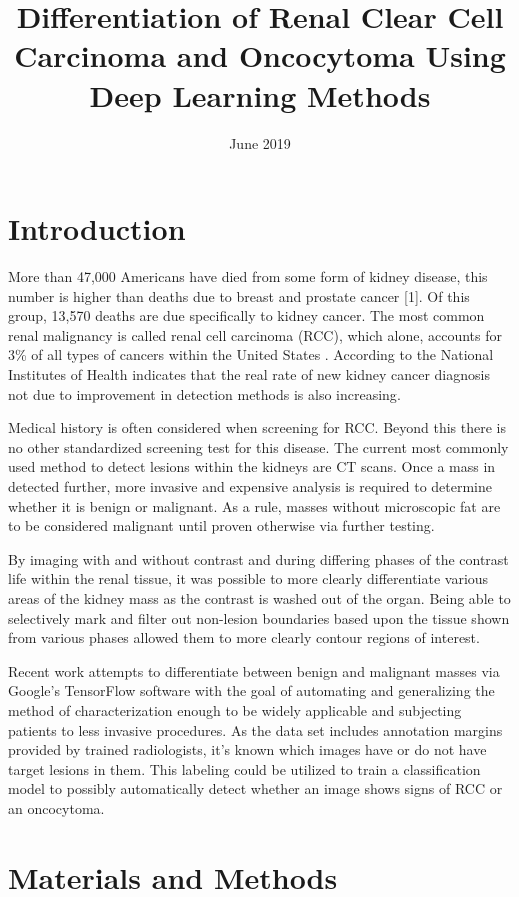 \documentclass[conference]{IEEEtran}
\title{Differentiation of Renal Clear Cell Carcinoma and Oncocytoma Using Deep Learning Methods}
\author{\IEEEauthorblockN{Erdi Kidane}
\IEEEauthorblockA{\textit{UCLA} \\
Los Angeles, USA \\
Erdi.Kidane@engineering.ucla.edu}
\and
\IEEEauthorblockN{Xuesen Cui}
\IEEEauthorblockA{\textit{UCLA} \\
Los Angeles, USA \\
cuixuesen@ucla.edu}
\and
\IEEEauthorblockN{Keane Gonzalez}
\IEEEauthorblockA{\textit{} 
Los Angeles, USA \\
kgonza@g.ucla.edu}
}
\date{June 2019}
\begin{document}
\maketitle

\section{Introduction}
More than 47,000 Americans have died from some form of kidney disease, this number is higher than deaths due to breast and prostate cancer [1]. Of this group, 13,570 deaths are due specifically to kidney cancer\cite{b2}.  The most common renal malignancy is called renal cell carcinoma (RCC), which alone, accounts for 3\% of all types of cancers within the United States\cite{b3} . According to the National Institutes of Health indicates that the real rate of new kidney cancer diagnosis not due to improvement in detection methods is also increasing\cite{b3}.  

Medical history is often considered when screening for RCC.  Beyond this there is no other standardized screening test for this disease\cite{b4}.  The current most commonly used method to detect lesions within the kidneys are CT scans.  Once a mass in detected further, more invasive and expensive analysis is required to determine whether it is benign or malignant.  As a rule, masses without microscopic fat are to be considered malignant\cite{b5} until proven otherwise via further testing. 

By imaging with and without contrast and during differing phases of the contrast life within the renal tissue, it was possible to more clearly differentiate various areas of the kidney mass as the contrast is washed out of the organ. Being able to selectively mark and filter out non-lesion boundaries based upon the tissue shown from various phases allowed them to more clearly contour regions of interest. 

Recent work attempts to differentiate between benign and malignant masses via Google’s TensorFlow software with the goal of automating and generalizing the method of characterization enough to be widely applicable and subjecting patients to less invasive procedures. As the data set includes annotation margins provided by trained radiologists, it's known which images have or do not have target lesions in them. This labeling could be utilized to train a classification model to possibly automatically detect whether an image shows signs of RCC or an oncocytoma.

\section{Materials and Methods}
\end{document}

